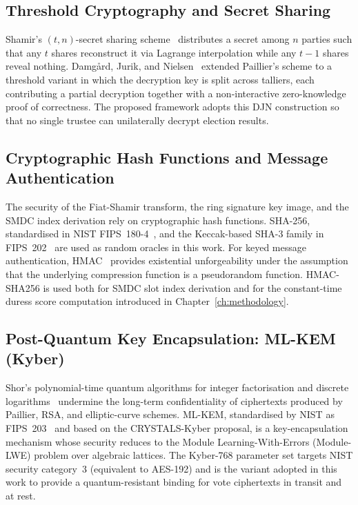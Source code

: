 \subsection{Threshold Cryptography and Secret Sharing}
\label{subsec:bg-threshold}

Shamir's $(t,n)$-secret sharing scheme~\cite{shamir1979} distributes a secret among $n$ parties such that any $t$ shares reconstruct it via Lagrange interpolation while any $t-1$ shares reveal nothing. Damg\aa rd, Jurik, and Nielsen~\cite{damgard2010} extended Paillier's scheme to a threshold variant in which the decryption key is split across talliers, each contributing a partial decryption together with a non-interactive zero-knowledge proof of correctness. The proposed framework adopts this DJN construction so that no single trustee can unilaterally decrypt election results.

\subsection{Cryptographic Hash Functions and Message Authentication}
\label{subsec:bg-hash-mac}

The security of the Fiat-Shamir transform, the ring signature key image, and the SMDC index derivation rely on cryptographic hash functions. SHA-256, standardised in NIST FIPS~180-4~\cite{nist_fips180_4}, and the Keccak-based SHA-3 family in FIPS~202~\cite{nist_fips202} are used as random oracles in this work. For keyed message authentication, HMAC~\cite{rfc2104,nist_fips198} provides existential unforgeability under the assumption that the underlying compression function is a pseudorandom function. HMAC-SHA256 is used both for SMDC slot index derivation and for the constant-time duress score computation introduced in Chapter~\ref{ch:methodology}.

\subsection{Post-Quantum Key Encapsulation: ML-KEM (Kyber)}
\label{subsec:bg-kyber}

Shor's polynomial-time quantum algorithms for integer factorisation and discrete logarithms~\cite{shor1997} undermine the long-term confidentiality of ciphertexts produced by Paillier, RSA, and elliptic-curve schemes. ML-KEM, standardised by NIST as FIPS~203~\cite{nist_kyber} and based on the CRYSTALS-Kyber proposal, is a key-encapsulation mechanism whose security reduces to the Module Learning-With-Errors (Module-LWE) problem over algebraic lattices. The Kyber-768 parameter set targets NIST security category~3 (equivalent to AES-192) and is the variant adopted in this work to provide a quantum-resistant binding for vote ciphertexts in transit and at rest.

